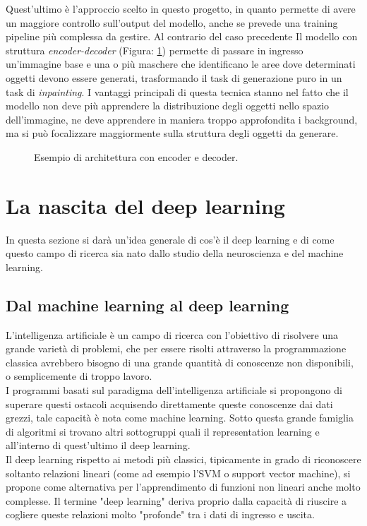     Quest'ultimo è l'approccio scelto in questo progetto, in quanto permette di avere un maggiore controllo sull'output del modello,
    anche se prevede una training pipeline più complessa da gestire.
    Al contrario del caso precedente Il modello con struttura \textit{encoder-decoder} (Figura: \ref{fig:encoder_decoder_architecture}) permette di passare in ingresso 
    un'immagine base e una o più maschere che identificano le aree dove determinati oggetti devono essere generati, trasformando il task di generazione puro in 
    un task di \textit{inpainting}.
    I vantaggi principali di questa tecnica stanno nel fatto che il modello non deve più apprendere la distribuzione degli oggetti nello spazio dell'immagine,
    ne deve apprendere in maniera troppo approfondita i background, ma si può focalizzare maggiormente sulla struttura degli oggetti da generare.
    
    \begin{figure}[H]
        \centering
        
        \caption{Esempio di architettura con encoder e decoder.}
        \label{fig:encoder_decoder_architecture}
    \end{figure}

\section{La nascita del deep learning \ok}

In questa sezione si darà un'idea generale di cos'è il deep learning e di come questo campo di ricerca sia nato dallo studio della
neuroscienza e del machine learning.

\subsection{Dal machine learning al deep learning}
L'intelligenza artificiale è un campo di ricerca con l'obiettivo di risolvere una grande varietà di problemi,
che per essere risolti attraverso la programmazione classica avrebbero bisogno di una grande quantità di conoscenze non disponibili, o semplicemente di troppo lavoro.\\
I programmi basati sul paradigma dell'intelligenza artificiale si propongono di superare questi ostacoli acquisendo direttamente queste conoscenze 
dai dati grezzi, tale capacità è nota come machine learning.
Sotto questa grande famiglia di algoritmi si trovano altri sottogruppi quali il representation learning e all'interno di quest'ultimo il deep learning.\\ 
Il deep learning rispetto ai metodi più classici, tipicamente in grado di riconoscere soltanto relazioni lineari (come ad esempio l'SVM o support vector machine), 
si propone come alternativa per l'apprendimento di funzioni non lineari anche molto complesse.
Il termine "deep learning" deriva proprio dalla capacità di riuscire a cogliere queste relazioni molto "profonde" tra i dati di ingresso e uscita.

